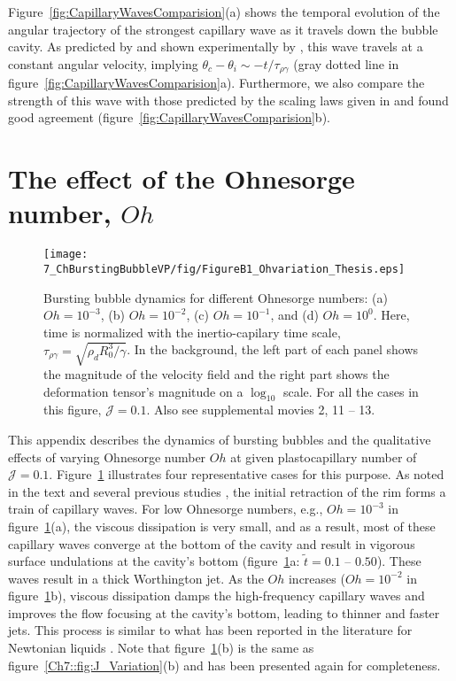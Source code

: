 \begin{subappendices}
Figure~\ref{fig:CapillaryWavesComparision}(a) shows the temporal evolution of the angular trajectory of the strongest capillary wave as it travels down the bubble cavity. As predicted by \citet{gordillo2019capillary} and shown experimentally by \citet{krishnan2017scaling}, this wave travels at a constant angular velocity, implying $\theta_c - \theta_i \sim -t/\tau_{\rho\gamma}$ (gray dotted line in figure~\ref{fig:CapillaryWavesComparision}a). Furthermore, we also compare the strength of this wave with those predicted by the scaling laws given in \citet{gordillo2019capillary} and found good agreement (figure~\ref{fig:CapillaryWavesComparision}b).  

\section{The effect of the Ohnesorge number, $Oh$}\label{App::OhsVariation}

\begin{figure}
	\centering
	\texttt{[image: 7\_ChBurstingBubbleVP/fig/FigureB1\_Ohvariation\_Thesis.eps]}
	\caption{Bursting bubble dynamics for different Ohnesorge numbers: (a) $Oh = 10^{-3}$, (b) $Oh = 10^{-2}$, (c) $Oh = 10^{-1}$, and (d) $Oh = 10^{0}$. Here, time is normalized with the inertio-capilary time scale, $\tau_{\rho\gamma} = \sqrt{\rho_d R_0^3/\gamma}$. In the background, the left part of each panel shows the magnitude of the velocity field and the right part shows the deformation tensor's magnitude on a $\log_{10}$ scale. For all the cases in this figure, $\mathcal{J} = 0.1$. Also see supplemental movies {\color{Myfig} 2, 11 -- 13}.}
	\label{Ch7::fig:Oh_Variation}
\end{figure}

This appendix describes the dynamics of bursting bubbles and the qualitative effects of varying Ohnesorge number $Oh$ at given plastocapillary number of $\mathcal{J}=0.1$. Figure~\ref{Ch7::fig:Oh_Variation} illustrates four representative cases for this purpose. As noted in the text and several previous studies \citep{duchemin2002jet, deike2018dynamics, gordillo2019capillary}, the initial retraction of the rim forms a train of capillary waves. For low Ohnesorge numbers, e.g., $Oh = 10^{-3}$ in figure~\ref{Ch7::fig:Oh_Variation}(a), the viscous dissipation is very small, and as a result, most of these capillary waves converge at the bottom of the cavity and result in vigorous surface undulations at the cavity's bottom (figure~\ref{Ch7::fig:Oh_Variation}a: $\tilde t = 0.1$ -- $0.50$). These waves result in a thick Worthington jet. As the $Oh$ increases ($Oh = 10^{-2}$ in figure~\ref{Ch7::fig:Oh_Variation}b), viscous dissipation damps the high-frequency capillary waves and improves the flow focusing at the cavity's bottom, leading to thinner and faster jets. This process is similar to what has been reported in the literature for Newtonian liquids \citep{duchemin2002jet, ghabache2014physics, deike2018dynamics}. Note that figure~\ref{Ch7::fig:Oh_Variation}(b) is the same as figure~\ref{Ch7::fig:J_Variation}(b) and has been presented again for completeness. 


\end{subappendices}
